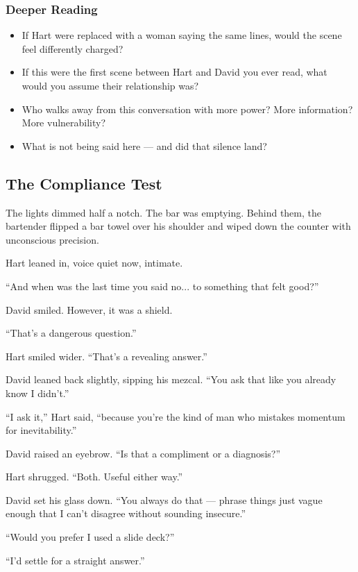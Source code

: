 \subsubsection{Deeper Reading}
\begin{itemize}
    \item If Hart were replaced with a woman saying the same lines, would the scene feel differently charged?
    \item If this were the first scene between Hart and David you ever read, what would you assume their relationship was?
    \item Who walks away from this conversation with more power? More information? More vulnerability?
    \item What is not being said here — and did that silence land?
\end{itemize}


\subsection{The Compliance Test}


The lights dimmed half a notch. The bar was emptying. Behind them, the bartender flipped a bar towel over his 
shoulder and wiped down the counter with unconscious precision.

Hart leaned in, voice quiet now, intimate.

``And when was the last time you said no... to something that felt good?''

David smiled. However, it was a shield.

``That’s a dangerous question.''

Hart smiled wider. ``That’s a revealing answer.''

David leaned back slightly, sipping his mezcal. ``You ask that like you already know I didn’t.''

``I ask it,'' Hart said, ``because you’re the kind of man who mistakes momentum for inevitability.''

David raised an eyebrow. ``Is that a compliment or a diagnosis?''

Hart shrugged. ``Both. Useful either way.''

David set his glass down. ``You always do that — phrase things just vague enough that I can't disagree without 
sounding insecure.''

``Would you prefer I used a slide deck?''

``I’d settle for a straight answer.''

